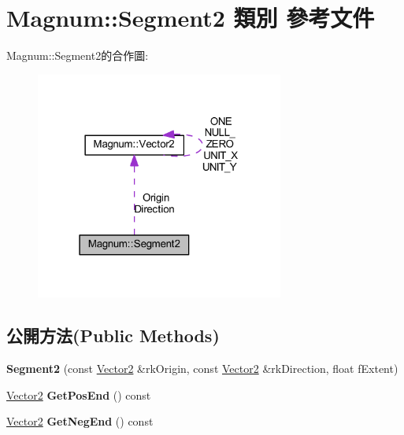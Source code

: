 \hypertarget{class_magnum_1_1_segment2}{}\section{Magnum\+:\+:Segment2 類別 參考文件}
\label{class_magnum_1_1_segment2}


Magnum\+:\+:Segment2的合作圖\+:\nopagebreak
\begin{figure}[H]
\begin{center}
\leavevmode
\includegraphics[width=231pt]{class_magnum_1_1_segment2__coll__graph}
\end{center}
\end{figure}
\subsection*{公開方法(Public Methods)}
\begin{DoxyCompactItemize}
\item 
{\bfseries Segment2} (const \hyperlink{class_magnum_1_1_vector2}{Vector2} \&rk\+Origin, const \hyperlink{class_magnum_1_1_vector2}{Vector2} \&rk\+Direction, float f\+Extent)\hypertarget{class_magnum_1_1_segment2_a9f2bbd8eab2eb74cbb989ad7d40281f7}{}\label{class_magnum_1_1_segment2_a9f2bbd8eab2eb74cbb989ad7d40281f7}

\item 
\hyperlink{class_magnum_1_1_vector2}{Vector2} {\bfseries Get\+Pos\+End} () const \hypertarget{class_magnum_1_1_segment2_a3cbb2227f356f5a809b6fe7a8b4fe7aa}{}\label{class_magnum_1_1_segment2_a3cbb2227f356f5a809b6fe7a8b4fe7aa}

\item 
\hyperlink{class_magnum_1_1_vector2}{Vector2} {\bfseries Get\+Neg\+End} () const \hypertarget{class_magnum_1_1_segment2_af28b1af7a04cc0eb5d00f48171993239}{}\label{class_magnum_1_1_segment2_af28b1af7a04cc0eb5d00f48171993239}

\end{DoxyCompactItemize}

